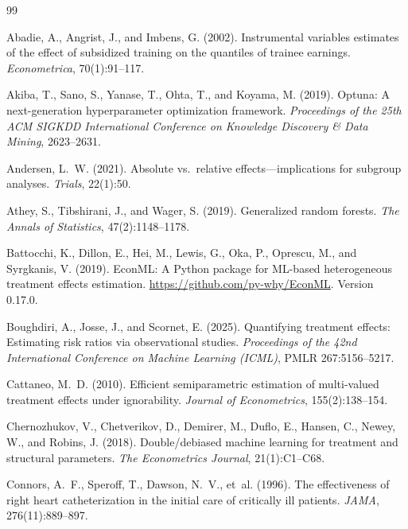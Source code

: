 \documentclass{article}
\begin{document}
\begin{thebibliography}{99}

Abadie, A., Angrist, J., and Imbens, G. (2002).
Instrumental variables estimates of the effect of subsidized training on the quantiles of trainee earnings.
\emph{Econometrica}, 70(1):91--117.

Akiba, T., Sano, S., Yanase, T., Ohta, T., and Koyama, M. (2019).
Optuna: A next-generation hyperparameter optimization framework.
\emph{Proceedings of the 25th ACM SIGKDD International Conference on Knowledge Discovery \& Data Mining}, 2623--2631.

Andersen, L.~W. (2021).
Absolute vs.\ relative effects---implications for subgroup analyses.
\emph{Trials}, 22(1):50.

Athey, S., Tibshirani, J., and Wager, S. (2019).
Generalized random forests.
\emph{The Annals of Statistics}, 47(2):1148--1178.

Battocchi, K., Dillon, E., Hei, M., Lewis, G., Oka, P., Oprescu, M., and Syrgkanis, V. (2019).
{EconML}: A {P}ython package for {ML}-based heterogeneous treatment effects estimation.
\url{https://github.com/py-why/EconML}. Version 0.17.0.

Boughdiri, A., Josse, J., and Scornet, E. (2025).
Quantifying treatment effects: Estimating risk ratios via observational studies.
\emph{Proceedings of the 42nd International Conference on Machine Learning (ICML)}, PMLR 267:5156--5217.

Cattaneo, M.~D. (2010).
Efficient semiparametric estimation of multi-valued treatment effects under ignorability.
\emph{Journal of Econometrics}, 155(2):138--154.

Chernozhukov, V., Chetverikov, D., Demirer, M., Duflo, E., Hansen, C., Newey, W., and Robins, J. (2018).
Double/debiased machine learning for treatment and structural parameters.
\emph{The Econometrics Journal}, 21(1):C1--C68.

Connors, A.~F., Speroff, T., Dawson, N.~V., et~al. (1996).
The effectiveness of right heart catheterization in the initial care of critically ill patients.
\emph{JAMA}, 276(11):889--897.


\end{thebibliography}
\end{document}
